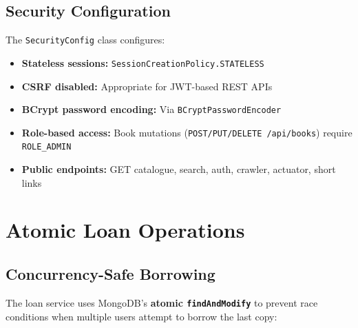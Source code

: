 \documentclass[12pt,a4paper]{report}
\begin{document}
\subsection{Security Configuration}
The \texttt{SecurityConfig} class configures:
\begin{itemize}[noitemsep]
    \item \textbf{Stateless sessions:} \texttt{SessionCreationPolicy.STATELESS}
    \item \textbf{CSRF disabled:} Appropriate for JWT-based REST APIs
    \item \textbf{BCrypt password encoding:} Via \texttt{BCryptPasswordEncoder}
    \item \textbf{Role-based access:} Book mutations (\texttt{POST/PUT/DELETE /api/books}) require \texttt{ROLE\_ADMIN}
    \item \textbf{Public endpoints:} GET catalogue, search, auth, crawler, actuator, short links
\end{itemize}

\section{Atomic Loan Operations}

\subsection{Concurrency-Safe Borrowing}
The loan service uses MongoDB's \textbf{atomic \texttt{findAndModify}} to prevent race conditions when multiple users attempt to borrow the last copy:
\end{document}
